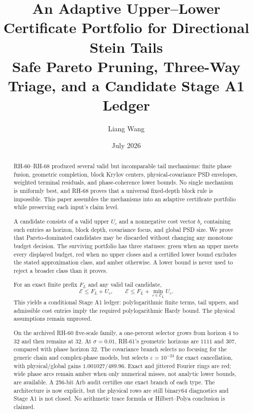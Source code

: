 \documentclass[11pt]{article}
\title{An Adaptive Upper--Lower Certificate Portfolio for Directional
Stein Tails\\
\large Safe Pareto Pruning, Three-Way Triage, and a Candidate Stage A1 Ledger}
\author{Liang Wang}
\date{July 2026}
\theoremstyle{definition}
\begin{document}
\maketitle

\begin{abstract}
RH-60--RH-68 produced several valid but incomparable tail mechanisms:
finite phase fusion, geometric completion, block Krylov centers,
physical-covariance PSD envelopes, weighted terminal residuals, and
phase-coherence lower bounds.  No single mechanism is uniformly best, and
RH-68 proves that a universal fixed-depth block rule is impossible.  This
paper assembles the mechanisms into an adaptive certificate portfolio while
preserving each input's claim level.

A candidate consists of a valid upper $U_c$ and a nonnegative cost vector
$b_c$ containing such entries as horizon, block depth, covariance focus, and
global PSD size.  We prove that Pareto-dominated candidates may be discarded
without changing any monotone budget decision.  The surviving portfolio has
three statuses: green when an upper meets every displayed budget, red when no
upper closes and a certified lower bound excludes the stated approximation
class, and amber otherwise.  A lower bound is never used to reject a broader
class than it proves.

For an exact finite prefix $F_L$ and any valid tail candidate,
\[
 \mathcal E\le F_L+U_c,
 \qquad
 \mathcal E\le F_L+\min_{c\in\mathcal C_L}U_c.
\]
This yields a conditional Stage A1 ledger: polylogarithmic finite terms,
tail uppers, and admissible cost entries imply the required
polylogarithmic Hardy bound.  The physical assumptions remain unproved.

On the archived RH-60 five-scale family, a one-percent selector grows from
horizon $4$ to $32$ and then remains at $32$.  At $\sigma=0.01$, RH-61's geometric
horizons are $1111$ and $307$, compared with phase horizon $32$.  The
covariance branch selects no focusing for the generic chain and complex-phase
models, but selects $\varepsilon=10^{-24}$ for exact cancellation, with
physical/global gains $1.001027/489.96$.  Exact and jittered Fourier rings are
red; wide phase arcs remain amber when only numerical misses, not analytic
lower bounds, are available.  A 256-bit Arb audit certifies one exact branch
of each type.  The architecture is now explicit, but the physical rows are
still binary64 diagnostics and Stage A1 is not closed.  No arithmetic trace
formula or Hilbert--Polya conclusion is claimed.
\end{abstract}
\end{document}
